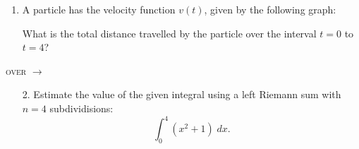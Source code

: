 \documentclass[11pt]{article}
\begin{document}
\pagestyle{empty}
\newsavebox{\quizfront}
\begin{lrbox}{\quizfront}
\begin{minipage}[top][4.5in][t]{\textwidth} \setlength{\parindent}{1.5em}
\drawtitle
\vspace{-0.5in}
\begin{enumerate}

\item A particle has the velocity function $v(t)$, given by the following graph:

\begin{center}
\end{center}
\vspace{-.1in}
What is the total distance travelled by the particle over the interval $t=0$ to $t=4$? 


\end{enumerate}

\vfill

\hfill\textsc{over} $\longrightarrow$


\end{minipage}
\end{lrbox}

\newsavebox{\quizback}
\begin{lrbox}{\quizback}
\begin{minipage}[top][4.5in][t]{\textwidth} \setlength{\parindent}{1.5em}
\begin{enumerate}
\item[2.] Estimate the value of the given integral using a left
  Riemann sum with $n=4$ subdividisions:
  \[
  \int_0^4 \left( x^2 + 1 \right) \; dx.
  \]

\end{enumerate}
\end{minipage}
\end{lrbox}

\noindent \usebox{\quizfront}
\vfill
\noindent \usebox{\quizfront}

\pagebreak
\noindent \usebox{\quizback}
\vfill
\noindent \usebox{\quizback}
\end{document}
